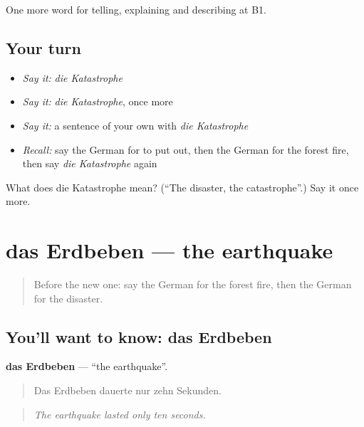 \begin{grammarlens}[title={What you've built}]
One more word for telling, explaining and describing at B1.
\end{grammarlens}

\subsection*{Your turn}
\begin{itemize}
\raggedright
  \item \emph{Say it:} \emph{die Katastrophe}
  \item \emph{Say it:} \emph{die Katastrophe}, once more
  \item \emph{Say it:} a sentence of your own with \emph{die Katastrophe}
  \item \emph{Recall:} say the German for to put out, then the German for the forest fire, then say \emph{die Katastrophe} again
\end{itemize}

\begin{tcolorbox}[breakable,colback=teal!4,colframe=teal!35!black,title={Before you move on}]
What does die Katastrophe mean? (\textquotedblleft{}The disaster, the catastrophe\textquotedblright{}.) Say it once more.
\end{tcolorbox}
\section[das Erdbeben]{das Erdbeben — the earthquake}

\label{lesson:GE-C294-erdbeben}



\begin{quote}
Before the new one: say the German for the forest fire, then the German for the disaster.
\end{quote}

\subsection*{You'll want to know: das Erdbeben}
\textbf{das Erdbeben} — \textquotedblleft{}the earthquake\textquotedblright{}.

\begin{quote}
Das Erdbeben dauerte nur zehn Sekunden.
\end{quote}

\begin{quote}
\emph{The earthquake lasted only ten seconds.}
\end{quote}


